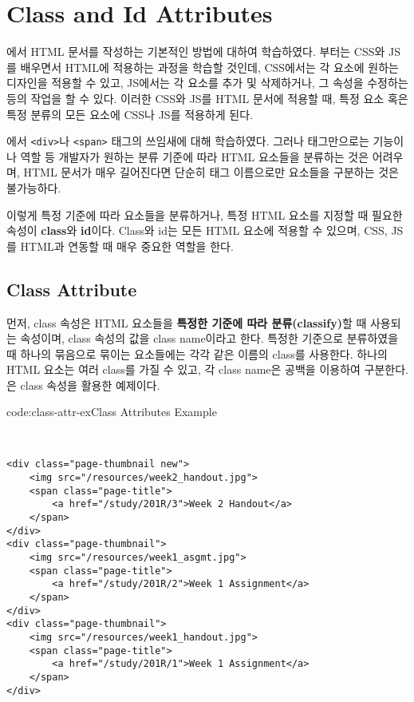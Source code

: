 \section{Class and Id Attributes} \label{sect:class-and-id-attributes}

에서 HTML 문서를 작성하는 기본적인 방법에 대하여 학습하였다. 부터는 CSS와 JS를 배우면서 HTML에 적용하는 과정을 학습할 것인데, CSS에서는 각 요소에 원하는 디자인을 적용할 수 있고, JS에서는 각 요소를 추가 및 삭제하거나, 그 속성을 수정하는 등의 작업을 할 수 있다. 이러한 CSS와 JS를 HTML 문서에 적용할 때, 특정 요소 혹은 특정 분류의 모든 요소에 CSS나 JS를 적용하게 된다.

에서 \verb|<div>|나 \verb|<span>| 태그의 쓰임새에 대해 학습하였다. 그러나 태그만으로는 기능이나 역할 등 개발자가 원하는 분류 기준에 따라 HTML 요소들을 분류하는 것은 어려우며, HTML 문서가 매우 길어진다면 단순히 태그 이름으로만 요소들을 구분하는 것은 불가능하다.

이렇게 특정 기준에 따라 요소들을 분류하거나, 특정 HTML 요소를 지정할 때 필요한 속성이 \textbf{class}와 \textbf{id}이다. Class와 id는 모든 HTML 요소에 적용할 수 있으며, CSS, JS를 HTML과 연동할 때 매우 중요한 역할을 한다. 

\subsection*{Class Attribute}
먼저, class 속성은 HTML 요소들을 \textbf{특정한 기준에 따라 분류(classify)}할 때 사용되는 속성이며, class 속성의 값을 class name이라고 한다. 특정한 기준으로 분류하였을 때 하나의 묶음으로 묶이는 요소들에는 각각 같은 이름의 class를 사용한다. 하나의 HTML 요소는 여러 class를 가질 수 있고, 각 class name은 공백을 이용하여 구분한다. 은 class 속성을 활용한 예제이다.

\begin{codeenv}{code:class-attr-ex}{Class Attributes Example}\begin{verbatim}


<div class="page-thumbnail new">
    <img src="/resources/week2_handout.jpg">
    <span class="page-title">
        <a href="/study/201R/3">Week 2 Handout</a>
    </span>
</div>
<div class="page-thumbnail">
    <img src="/resources/week1_asgmt.jpg">
    <span class="page-title">
        <a href="/study/201R/2">Week 1 Assignment</a>
    </span>
</div>
<div class="page-thumbnail">
    <img src="/resources/week1_handout.jpg">
    <span class="page-title">
        <a href="/study/201R/1">Week 1 Assignment</a>
    </span>
</div>
\end{verbatim}
\end{codeenv}
\pagebreak

